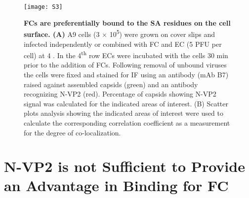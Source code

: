 \begin{figure}
\centering
  \texttt{[image: S3]} \\[0.35 cm]
  \caption[FCs are Preferentially Bound to the SA Residues on the Cell Surface]
   {\textbf{FCs are preferentially bound to the SA residues on the cell surface. (A)} A9 cells (3 $\times$ 10\textsuperscript{5}) were grown on cover slips and infected independently or combined with FC and EC (5 PFU per cell) at 4 \textcelsius. In the 4\textsuperscript{th} row ECs were incubated with the cells 30 min prior to the addition of FCs. Following removal of unbound viruses the cells were fixed and stained for IF using an antibody (mAb B7) raised against assembled capsids (green) and an antibody recognizing N-VP2 (red). Percentage of capsids showing N-VP2 signal was calculated for the indicated areas of interest. (B) Scatter plots analysis showing the indicated areas of interest were used to calculate the corresponding correlation coefficient as a measurement for the degree of co-localization.} 
\label{S3}
\end{figure}



\section{N-VP2 is not Sufficient to Provide an Advantage in Binding for FC}

